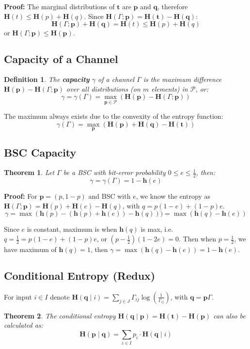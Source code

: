 \documentclass[11pt]{article}
\newtheorem{defn}{Definition}
\newtheorem{theo}{Theorem}
\begin{document}
\textbf{Proof:}
The marginal distributions of $\textbf{t}$ are $\textbf{p}$ and $\textbf{q}$, therefore $\textbf{H}(t) \leq \textbf{H}(p) + \textbf{H}(q)$.
Since $\textbf{H}(\Gamma ; \textbf{p}) = \textbf{H}(\textbf{t}) -  \textbf{H}(\textbf{q})$:
\[
  \textbf{H}(\Gamma ; \textbf{p}) + \textbf{H}(\textbf{q}) = \textbf{H}(t) \leq \textbf{H}(p) + \textbf{H}(q)
\]
or $\textbf{H}(\Gamma ; \textbf{p}) \leq \textbf{H}(\textbf{p})$.

\subsection{Capacity of a Channel}
\begin{defn}
  The \textbf{capacity} $\gamma$ of a channel $\Gamma$ is the maximum difference $\textbf{H}(\textbf{p}) - \textbf{H}(\Gamma ; \textbf{p})$ over all distributions (on $m$ elements) in $\mathcal{P}$, or:
  \[
    \gamma = \gamma(\Gamma) = \max_{\textbf{p} \in \mathcal{P}} (\textbf{H}(\textbf{p}) - \textbf{H}(\Gamma ; \textbf{p}))
  \]
\end{defn}

The maximum always exists due to the convexity of the entropy function:
\[
  \gamma(\Gamma) = \max_{\textbf{p}} (\textbf{H}(\textbf{p}) + \textbf{H}(\textbf{q}) - \textbf{H}(\textbf{t}))
\]

\subsection{BSC Capacity}
\begin{theo}
  Let $\Gamma$ be a BSC with bit-error probability $0 \leq e \leq \frac{1}{2}$, then:
  \[
    \gamma = \gamma(\Gamma) = 1 - \textbf{h}(e)
  \]
\end{theo}

\textbf{Proof:}
For $\textbf{p} = (p, 1 - p)$ and BSC with $e$, we know the entropy as $\textbf{H}(\Gamma ; \textbf{p}) = \textbf{H}(p) + \textbf{H}(e) - \textbf{H}(q)$, with $q = p(1 - e) + (1 - p)e$.
\[
  \gamma = \max(\textbf{h}(p) - (\textbf{h}(p) + \textbf{h}(e)) -\textbf{h}(q))) = \max(\textbf{h}(q)- \textbf{h}(e))
\]

Since $e$ is constant, maximum is when $\textbf{h}(q)$ is max, i.e.\ $q = \frac{1}{2} = p(1 - e) + (1 - p)e$, or $(p -\frac{1}{2})(1 - 2e) = 0$.
Then when $p = \frac{1}{2}$, we have maximum of $\textbf{h}(q) = 1$, then $\gamma = \max(\textbf{h}(q)- \textbf{h}(e)) = 1 - \textbf{h}(e)$.

\subsection{Conditional Entropy (Redux)}
For input $i \in I$ denote $\textbf{H}(\textbf{q} \mid i) = \sum_{j \in J} \Gamma_{ij} \log (\frac{1}{\Gamma_{ij}})$, with $\textbf{q} = \textbf{p}\Gamma$.

\begin{theo}
  The conditional entropy $\textbf{H}(\textbf{q} \mid \textbf{p}) = \textbf{H}(\textbf{t}) -  \textbf{H}(\textbf{p})$ can also be calculated as:
  \[
    \textbf{H}(\textbf{p} \mid \textbf{q}) = \sum_{i \in I} p_i \cdot \textbf{H}(\textbf{q} \mid i) 
  \]
\end{theo}
\end{document}
